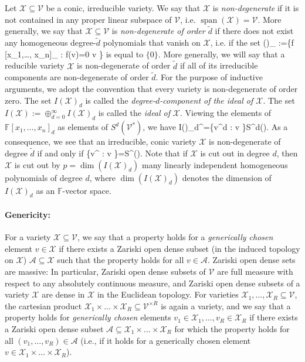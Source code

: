 \documentclass[11pt]{article}
\theoremstyle{definition}
\newcommand{\field}{\mathbb{F}}
\newcommand\X{\mathcal{X}}
\newcommand\A{\mathcal{A}}
\newcommand\V{\mathcal{V}}
\DeclareMathOperator{\spn}{span}
\def\ba#1\ea{\begin{align}#1\end{align}}
\begin{document}
Let $\X\subseteq \V$ be a conic, irreducible variety. We say that $\X$ is \textit{non-degenerate} if it is not contained in any proper linear subspace of $\V$, i.e. $\spn(\X)=\V$. More generally, we say that $\X \subseteq \V$ is \textit{non-degenerate of order $\tilde{d}$} if there does not exist any homogeneous degree-$\tilde{d}$ polynomials that vanish on $\X$, i.e. if the set
\ba
I(\X)_{} :=\{f \in \field[x_1,\dots, x_n]_{} : f(v)=0 \quad {} \quad v \in \X\}
\ea
is equal to $\{0\}$. More generally, we will say that a reducible variety $\X$ is non-degenerate of order $\tilde{d}$ if all of its irreducible components are non-degenerate of order $\tilde{d}$. For the purpose of inductive arguments, we adopt the convention that every variety is non-degenerate of order zero. The set $I(\X)_d$ is called the \textit{degree-$d$-component of the ideal of $\X$}. The set $I(\X):= \oplus_{d=0}^{\infty} I(\X)_d$ is called the \textit{ideal of} $\X$.
Viewing the elements of $\field[x_1,\dots, x_n]_d$ as elements of $S^d(\V^*)$, we have
\ba\label{eq:ideal}
I(\X)_d^{\perp}=\spn\{v^{\otimes d} : v \in \X\}\subseteq S^d(\V).
\ea
As a consequence, we see that an irreducible, conic variety $\X$ is non-degenerate of degree $\tilde{d}$ if and only if
\ba
\spn\{v^{\otimes {}} : v \in \X\}=S^{}(\V).
\ea
Note that if $\X$ is cut out in degree $d$, then $\X$ is cut out by $p=\dim(I(\X)_d)$ many linearly independent homogeneous polynomials of degree $d$, where $\dim(I(\X)_d)$ denotes the dimension of $I(\X)_d$ as an $\field$-vector space.

\paragraph{Genericity:} For a variety $\X \subseteq \V$, we say that a property holds for a \textit{generically chosen} element $v \in \X$ if there exists a Zariski open dense subset (in the induced topology on $\X$) $\A \subseteq \X$ such that the property holds for all $v \in \A$. Zariski open dense sets are massive: In particular, Zariski open dense subsets of $\V$ are full measure with respect to any absolutely continuous measure, and Zariski open dense subsets of a variety $\X$ are dense in $\X$ in the Euclidean topology. For varieties $\X_1,\dots, \X_{R} \subseteq \V$, the cartesian product $\X_1\times \dots \times \X_{R} \subseteq \V^{\times R}$ is again a variety, and we say that a property holds for \textit{generically chosen} elements $v_1 \in \X_1,\dots, v_{R} \in \X_{R}$ if there exists a Zariski open dense subset $\A \subseteq \X_1 \times \dots \times \X_{R}$ for which the property holds for all $(v_1,\dots, v_{R})\in \A$ (i.e., if it holds for a generically chosen element $v \in \X_1 \times \dots \times \X_{R}$).
\end{document}

